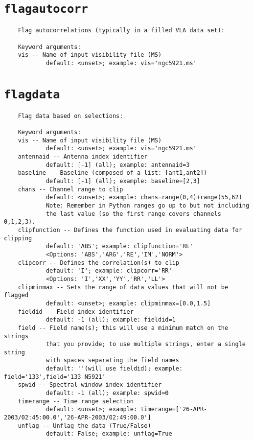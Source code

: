 \section{{\tt flagautocorr}}
\label{section:tasks.flagautocorr}

\small
\begin{verbatim}
    Flag autocorrelations (typically in a filled VLA data set):
    
    Keyword arguments:
    vis -- Name of input visibility file (MS)
            default: <unset>; example: vis='ngc5921.ms'

\end{verbatim}
\normalsize


\section{{\tt flagdata}}
\label{section:tasks.flagdata}

\small
\begin{verbatim}
    Flag data based on selections:
    
    Keyword arguments:
    vis -- Name of input visibility file (MS)
            default: <unset>; example: vis='ngc5921.ms'
    antennaid -- Antenna index identifier
            default: [-1] (all); example: antennaid=3
    baseline -- Baseline (composed of a list: [ant1,ant2])
            default: [-1] (all); example: baseline=[2,3]
    chans -- Channel range to clip
            default: <unset>; example: chans=range(0,4)+range(55,62)
            Note: Remember in Python ranges go up to but not including
            the last value (so the first range covers channels 0,1,2,3).
    clipfunction -- Defines the function used in evaluating data for clipping
            default: 'ABS'; example: clipfunction='RE'
            <Options: 'ABS','ARG','RE','IM','NORM'>
    clipcorr -- Defines the correlation(s) to clip
            default: 'I'; example: clipcorr='RR'
            <Options: 'I','XX','YY','RR','LL'>
    clipminmax -- Sets the range of data values that will not be flagged
            default: <unset>; example: clipminmax=[0.0,1.5]
    fieldid -- Field index identifier
            default: -1 (all); example: fieldid=1
    field -- Field name(s); this will use a minimum match on the strings
            that you provide; to use multiple strings, enter a single string
            with spaces separating the field names
            default: ''(will use fieldid); example: field='133',field='133 N5921'
    spwid -- Spectral window index identifier
            default: -1 (all); example: spwid=0
    timerange -- Time range selection
            default: <unset>; example: timerange=['26-APR-2003/02:45:00.0','26-APR-2003/02:49:00.0']
    unflag -- Unflag the data (True/False)
            default: False; example: unflag=True
\end{verbatim}
\normalsize


